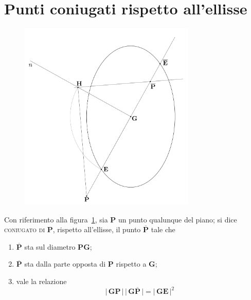 \section{Punti coniugati rispetto all'ellisse}
\renewcommand{\thefigure}{6~-~3}
\begin{figure}[ht]
\centering
\includegraphics[width=0.75\textwidth]{Immagini/Parte_6/Figura6_3/Figura6_3.pdf}
\caption{}
\label{figura6-3}
\end{figure}
Con riferimento alla figura~\ref{figura6-3}, sia $\mathbf{P}$ un punto qualunque del piano; si dice \textsc{coniugato di} $\mathbf{P}$, rispetto all'ellisse, il punto $\overline{\mathbf{P}}$ tale che 
\begin{enumerate}
\item $\overline{\mathbf{P}}$ sta sul diametro $\mathbf{P}\mathbf{G}$;
\item $\overline{\mathbf{P}}$ sta dalla parte opposta di $\mathbf{P}$ rispetto a $\mathbf{G}$; 
\item vale la relazione 
\begin{equation} \label{equazione6-4}
\lvert\,\mathbf{G}\mathbf{P}\,\lvert\,\lvert\,\mathbf{G}\overline{\mathbf{P}}\,\lvert = \lvert\,\mathbf{G}\mathbf{E}\,\lvert^2
\tag{6.4}
\end{equation}
\end{enumerate}
